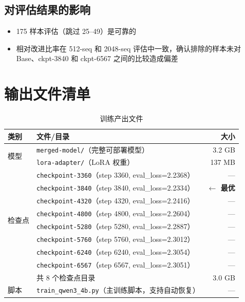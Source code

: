 \documentclass[12pt,a4paper]{ctexart}
\begin{document}
\subsection{对评估结果的影响}

\begin{itemize}[nosep]
    \item 175 样本评估（跳过 25--49）是可靠的
    \item 相对改进比率在 512-seq 和 2048-seq 评估中一致，确认排除的样本未对 Base、ckpt-3840 和 ckpt-6567 之间的比较造成偏差
\end{itemize}

\section{输出文件清单}

\begin{table}[htbp]\centering
\caption{训练产出文件}
\small
\begin{tabular}{@{}llr@{}}
\toprule
\textbf{类别} & \textbf{文件/目录} & \textbf{大小} \\
\midrule
\multirow{2}{*}{模型} & \texttt{merged-model/}（完整可部署模型）& 3.2 GB \\
                      & \texttt{lora-adapter/}（LoRA 权重）& 137 MB \\
\midrule
\multirow{8}{*}{检查点} & \texttt{checkpoint-3360}（step 3360, eval\_loss=2.2368）& --- \\
                        & \texttt{checkpoint-3840}（step 3840, eval\_loss=2.2334）& \textbf{$\leftarrow$ 最优} \\
                        & \texttt{checkpoint-4320}（step 4320, eval\_loss=2.2416）& --- \\
                        & \texttt{checkpoint-4800}（step 4800, eval\_loss=2.2604）& --- \\
                        & \texttt{checkpoint-5280}（step 5280, eval\_loss=2.2887）& --- \\
                        & \texttt{checkpoint-5760}（step 5760, eval\_loss=2.3012）& --- \\
                        & \texttt{checkpoint-6240}（step 6240, eval\_loss=2.3054）& --- \\
                        & \texttt{checkpoint-6567}（step 6567, eval\_loss=2.3051）& --- \\
                        & 共 8 个检查点目录 & 3.0 GB \\
\midrule
\multirow{6}{*}{脚本} & \texttt{train\_qwen3\_4b.py}（主训练脚本，支持自动恢复）& --- \\

\end{tabular}
\end{table}
\end{document}

